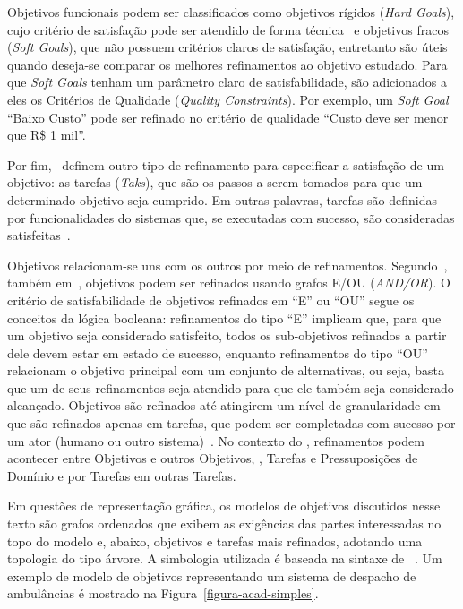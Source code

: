 Objetivos funcionais podem ser classificados como objetivos rígidos (\textit{Hard Goals}), cujo critério de satisfação pode ser atendido de forma técnica~\cite{dardenne1993goal} e objetivos fracos (\textit{Soft Goals}), que não possuem critérios claros de satisfação, entretanto são úteis quando deseja-se comparar os melhores refinamentos ao objetivo estudado. Para que \textit{Soft Goals} tenham um parâmetro claro de satisfabilidade, são adicionados a eles os Critérios de Qualidade (\textit{Quality Constraints}). Por exemplo, um \textit{Soft Goal} ``Baixo Custo'' pode ser refinado no critério de qualidade ``Custo deve ser menor que R\$ 1 mil''.

Por fim,~ definem outro tipo de refinamento para especificar a satisfação de um objetivo: as tarefas (\textit{Taks}), que são os passos a serem tomados para que um determinado objetivo seja cumprido. Em outras palavras, tarefas são definidas por funcionalidades do sistemas que, se executadas com sucesso, são consideradas satisfeitas~\cite{souza2012requirement}.

Objetivos relacionam-se uns com os outros por meio de refinamentos. Segundo~, também em~\cite{dardenne1993goal}, objetivos podem ser refinados usando grafos E/OU (\textit{AND/OR}). O critério de satisfabilidade de objetivos refinados em ``E'' ou ``OU'' segue os conceitos da lógica booleana: refinamentos do tipo ``E'' implicam que, para que um objetivo seja considerado satisfeito, todos os sub-objetivos refinados a partir dele devem estar em estado de sucesso, enquanto refinamentos do tipo ``OU'' relacionam o objetivo principal com um conjunto de alternativas, ou seja, basta que um de seus refinamentos seja atendido para que ele também seja considerado alcançado. Objetivos são refinados até atingirem um nível de granularidade em que são refinados apenas em tarefas, que podem ser completadas com sucesso por um ator (humano ou outro sistema)~\cite{souza2013awareness}. No contexto do \zanshin, refinamentos podem acontecer entre Objetivos e outros Objetivos, \sofgoals, Tarefas e Pressuposições de Domínio e por Tarefas em outras Tarefas.

Em questões de representação gráfica, os modelos de objetivos discutidos nesse texto são grafos ordenados que exibem as exigências das partes interessadas no topo do modelo e, abaixo, objetivos e tarefas mais refinados, adotando uma topologia do tipo árvore. A simbologia utilizada é baseada na sintaxe de \istar~\cite{yu20111}. Um exemplo de modelo de objetivos representando um sistema de despacho de ambulâncias é mostrado na Figura~\ref{figura-acad-simples}.

